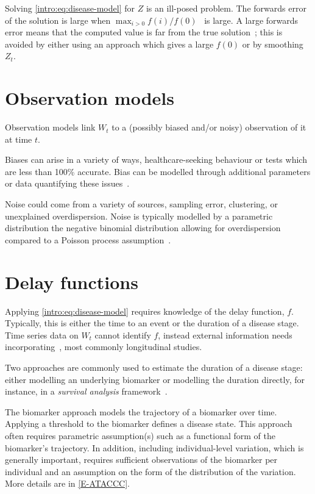 \documentclass[thesis.tex]{subfiles}
\begin{document}
Solving \cref{intro:eq:disease-model} for $Z$ is an ill-posed problem.
The forwards error of the solution is large when $\max_{i > 0} f(i) / f(0)$~\autocite[chapter 8.2]{highamAccuracy} is large.
A large forwards error means that the computed value is far from the true solution~\autocite[6--9]{highamAccuracy}; this is avoided by either using an approach which gives a large $f(0)$ or by smoothing $Z_t$.

\section{Observation models}

Observation models link $W_t$ to a (possibly biased and/or noisy) observation of it at time $t$.

Biases can arise in a variety of ways, \eg healthcare-seeking behaviour or tests which are less than 100\% accurate.
Bias can be modelled through additional parameters or data quantifying these issues~\autocite[e.g.][]{sherrattExploring,birrellBayesian,nicholsonImproving,swallow2022challenges}.

Noise could come from a variety of sources, \eg sampling error, clustering, or unexplained overdispersion.
Noise is typically modelled by a parametric distribution \eg the negative binomial distribution allowing for overdispersion compared to a Poisson process assumption~\autocite[e.g.][]{birrellBayesian,frassoBayesian}.

\section{Delay functions}

Applying \cref{intro:eq:disease-model} requires knowledge of the delay function, $f$.
Typically, this is either the time to an event or the duration of a disease stage.
Time series data on $W_t$ cannot identify $f$, instead external information needs incorporating~\autocite{swallow2022challenges}, most commonly longitudinal studies.

Two approaches are commonly used to estimate the duration of a disease stage: either modelling an underlying biomarker or modelling the duration directly, for instance, in a \emph{survival analysis} framework~\autocite[e.g.][]{sweetingEstimating}.

The biomarker approach models the trajectory of a biomarker over time.
Applying a threshold to the biomarker defines a disease state.
This approach often requires parametric assumption(s) such as a functional form of the biomarker's trajectory.
In addition, including individual-level variation, which is generally important, requires sufficient observations of the biomarker per individual and an assumption on the form of the distribution of the variation.
More details are in \cref{E-ATACCC}.
\end{document}

